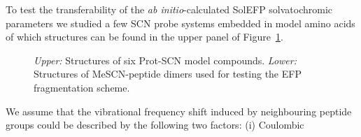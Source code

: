 \documentclass[a4paper,titlepage,twoside,fleqn,12pt]{book}
\begin{document}
\begin{refsection}
To test the transferability of the \emph{ab initio}\hyp{}calculated SolEFP
solvatochromic parameters we studied a few SCN probe
systems embedded in model amino acids of which structures
can be found in the upper panel of Figure~\ref{f:mescn-prot-struct}. 
%
\begin{figure}[t!]
\centering
\setlength\fboxsep{0.4pt}
\setlength\fboxrule{0.5pt}
\caption{
\emph{Upper:} Structures of six Prot-SCN model compounds.
\emph{Lower:} Structures of MeSCN-peptide dimers used for testing the EFP fragmentation
scheme.
\label{f:mescn-prot-struct}}
\end{figure}
%
We assume that the vibrational
frequency shift induced by neighbouring peptide groups could
be described by the following two factors: (i) Coulombic

\end{refsection}
\end{document}
